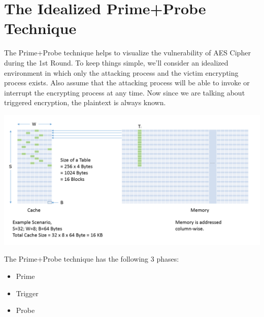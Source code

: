 \section{The Idealized Prime+Probe Technique}

The Prime+Probe technique helps to visualize the vulnerability of AES Cipher during the 1st Round. To keep things simple, we'll consider an idealized environment in which only the attacking process and the victim encrypting process exists. Also assume that the attacking process will be able to invoke or interrupt the encrypting process at any time. Now since we are talking about triggered encryption, the plaintext is always known.

\begin{center}
\includegraphics[scale=0.4,natwidth=1159,natheight=589]{Figures/lookup(new).png}
\label{fig: Demonstration of how AES Lookup Table fits in memory and cache.}
\end{center}

\begin{flushleft}
The Prime+Probe technique has the following 3 phases:
\end{flushleft}

\begin{itemize}
\item Prime
\item Trigger
\item Probe
\end{itemize}

